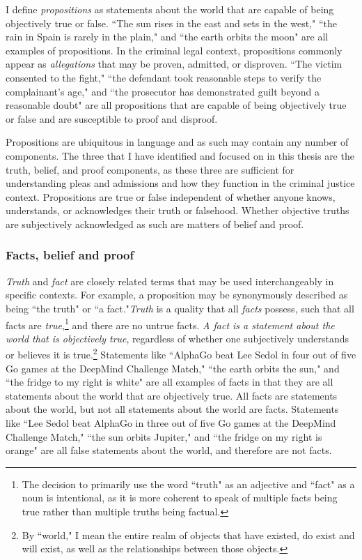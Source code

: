 I define \textit{propositions} as statements about the world that are capable of being objectively true or false. ``The sun rises in the east and sets in the west," ``the rain in Spain is rarely in the plain," and ``the earth orbits the moon" are all examples of propositions. In the criminal legal context, propositions commonly appear as \textit{allegations} that may be proven, admitted, or disproven. ``The victim consented to the fight," ``the defendant took reasonable steps to verify the complainant's age," and ``the prosecutor has demonstrated guilt beyond a reasonable doubt" are all propositions that are capable of being objectively true or false and are susceptible to proof and disproof.

Propositions are ubiquitous in language and as such may contain any number of components. The three that I have identified and focused on in this thesis are the truth, belief, and proof components, as these three are sufficient for understanding pleas and admissions and how they function in the criminal justice context. Propositions are true or false independent of whether anyone knows, understands, or acknowledges their truth or falsehood. Whether objective truths are subjectively acknowledged as such are matters of belief and proof.

\subsubsection{Facts, belief and proof}

\textit{Truth} and \textit{fact} are closely related terms that may be used interchangeably in specific contexts. For example, a proposition may be synonymously described as being ``the truth" or ``a fact."\textit{Truth} is a quality that all \textit{facts} possess, such that all facts are \textit{true},\footnote{The decision to primarily use the word ``truth" as an adjective and ``fact" as a noun is intentional, as it is more coherent to speak of multiple facts being true rather than multiple truths being factual.} and there are no untrue facts. \textit{A fact is a statement about the world that is objectively true}, regardless of whether one subjectively understands or believes it is true.\footnote{By ``world," I mean the entire realm of objects that have existed, do exist and will exist, as well as the relationships between those objects.} Statements like ``AlphaGo beat Lee Sedol in four out of five Go games at the DeepMind Challenge Match," ``the earth orbits the sun," and ``the fridge to my right is white" are all examples of facts in that they are all statements about the world that are objectively true. All facts are statements about the world, but not all statements about the world are facts. Statements like ``Lee Sedol beat AlphaGo in three out of five Go games at the DeepMind Challenge Match," ``the sun orbits Jupiter," and ``the fridge on my right is orange" are all false statements about the world, and therefore are not facts.


